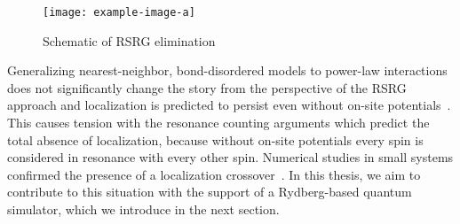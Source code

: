 \begin{figure}[htb]
	\centering
	\texttt{[image: example-image-a]}
	\caption{Schematic of RSRG elimination}
\end{figure}

Generalizing nearest-neighbor, bond-disordered models to power-law interactions does not significantly change the story from the perspective of the RSRG approach and localization is predicted to persist even without on-site potentials~\cite{moureManyBodyLocalizationTransition2015,moureDisorderedQuantumSpin2018,kutlinRenormalizationLocalizationSmall2020}. This causes tension with the resonance counting arguments which predict the total absence of localization, because without on-site potentials every spin is considered in resonance with every other spin.
Numerical studies in small systems confirmed the presence of a localization crossover~\cite{mohdebEntanglementPropertiesDisordered2020,mohdebExcitedEigenstateEntanglementProperties2022,mohdebGlobalQuenchDynamics2023}. 
In this thesis, we aim to contribute to this situation with the support of a Rydberg-based quantum simulator, which we introduce in the next section.









